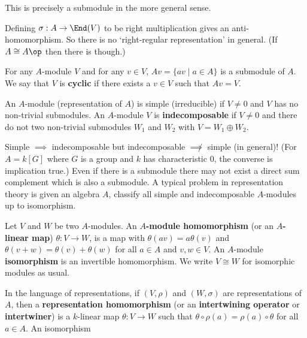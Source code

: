 \begin{rmk}
	This is precisely a submodule in the more general sense.
\end{rmk}

\begin{rmk}
	Defining $\sigma:A \to \End(V)$ to be right multiplication gives an anti-homomorphism.
	So there is no `right-regular representation' in general.
	(If $A \cong A\op$ then there is though.)
\end{rmk}

\begin{defn}
	For any $A$-module $V$ and for any $v \in V$, $Av = \{av \mid a \in A\}$ is a submodule of $A$.
	We say that $V$ is \textbf{cyclic} if there exists a $v \in V$ such that $Av=V$.
\end{defn}

\begin{defn}
	An $A$-module (representation of $A$) is simple (irreducible) if $V \neq 0$ and $V$ has no non-trivial submodules.
	An $A$-module $V$ is \textbf{indecomposable} if $V \neq 0$ and there do not two non-trivial submodules $W_1$ and $W_2$ with $V = W_1 \oplus W_2$.
\end{defn}

\begin{rmk}
	Simple $\implies$ indecomposable but indecomposable $\not\implies$ simple (in general)!
	(For $A=k[G]$ where $G$ is a group and $k$ has characteristic $0$, the converse is implication true.)
	Even if there is a submodule there may not exist a direct sum complement which is also a submodule.
	A typical problem in representation theory is given an algebra $A$, classify all simple and indecomposable $A$-modules up to isomorphism.
\end{rmk}

\begin{defn}
	Let $V$ and $W$ be two $A$-modules.
	An \textbf{$A$-module homomorphism} (or an \textbf{$A$-linear map}) $\theta:V \to W$, is a map with \@ $\theta(av)=a\theta(v)$ and $\theta(v+w)=\theta(v)+\theta(w)$ for all $a \in A$ and $v,w \in V$.
	An $A$-module \textbf{isomorphism} is an invertible homomorphism.
	We write $V \cong W$ for isomorphic modules as usual.
	
	In the language of representations, if $(V,\rho)$ and $(W,\sigma)$ are representations of $A$, then a \textbf{representation homomorphism} (or an \textbf{intertwining operator} or \textbf{intertwiner}) is a $k$-linear map $\theta: V \to W$ such that $\theta \circ \rho(a) = \rho(a) \circ \theta$ for all $a \in A$.
	An isomorphism
\end{defn}


